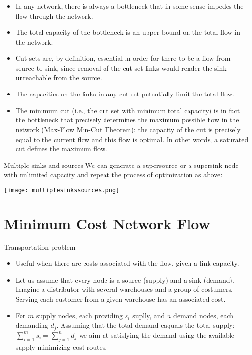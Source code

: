 \documentclass[c]{beamer}
\begin{document}
\begin{frame}
  \begin{itemize}
    \item In any network, there is always a bottleneck that in some sense impedes the flow through the network. 
    \item The total capacity of the bottleneck is an upper bound on the total flow in the network. 
    \item Cut sets are, by definition, essential in order for there to be a flow from source to sink, since removal of the cut set links would render the sink unreachable from the source. 
    \item The capacities on the links in any cut set potentially limit the total flow. 
    \item The minimum cut (i.e., the cut set with minimum total capacity) is in fact the bottleneck that precisely determines the maximum possible flow in the network (Max-Flow Min-Cut Theorem): the capacity of the cut is precisely equal to the current flow and this flow is optimal. In other words, a saturated cut defines the maximum flow.
  \end{itemize}
\end{frame}

\begin{frame}{Multiple sinks and sources}
  We can generate a supersource or  a  supersink node with unlimited capacity and repeat the process of optimization as above:
  \begin{center}
    \texttt{[image: multiplesinkssources.png]}
  \end{center}
\end{frame}

\section{Minimum Cost Network Flow}

\begin{frame}{Transportation problem}
\begin{itemize}
  \item Useful when there are costs associated with the flow, given a link capacity. 
  \item Let us assume that every node is a source (supply) and a sink (demand). Imagine a distributor with several warehouses and a group of costumers. Serving each customer from a given warehouse has an associated cost.
  \item For $m$ supply nodes, each providing $s_i$ suplly,  and $n$ demand nodes, each demanding $d_j$. Assuming that the total demand eaquals the total supply: $\sum_{i=1}^m s_i = \sum_{j=1}^n d_j$ we aim at satisfying the demand using the available supply minimizing cost routes.
\end{itemize}
\end{frame}
\end{document}
